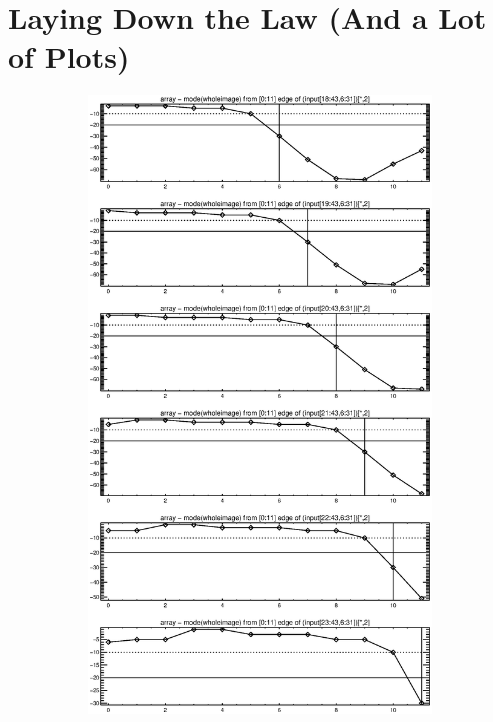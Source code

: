 \documentclass[10pt]{article}
\begin{document}

\clearpage
\newpage

\section{Laying Down the Law (And a Lot of Plots)} %
\label{sec:laying_down_the_law_}

\begin{figure}[!h]
    \centering 
    \hspace{-1.0in}
    \begin{subfigure}[b]{.4\linewidth}
        \centering
        \includegraphics[width=1.4\textwidth]{plots_tables_images/botright0.eps} 

\end{subfigure}
\end{figure}
\end{document}
